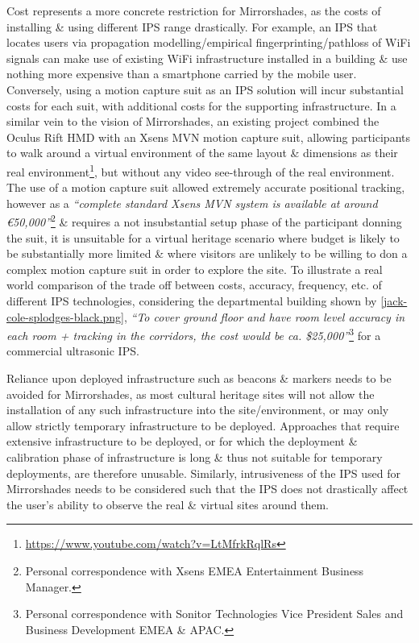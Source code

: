 Cost represents a more concrete restriction for Mirrorshades, as the costs of installing \& using different IPS range drastically. For example, an IPS that locates users via propagation modelling/empirical fingerprinting/pathloss of WiFi signals can make use of existing WiFi infrastructure installed in a building \& use nothing more expensive than a smartphone carried by the mobile user. Conversely, using a motion capture suit as an IPS solution will incur substantial costs for each suit, with additional costs for the supporting infrastructure. In a similar vein to the vision of Mirrorshades, an existing project combined the Oculus Rift HMD with an Xsens MVN motion capture suit, allowing participants to walk around a virtual environment of the same layout \& dimensions as their real environment\footnote{\url{https://www.youtube.com/watch?v=LtMfrkRqlRs}}, but without any video see-through of the real environment. The use of a motion capture suit allowed extremely accurate positional tracking, however as a \textit{``complete standard Xsens MVN system is available at around \euro{}50,000''}\footnote{Personal correspondence with Xsens EMEA Entertainment Business Manager.} \& requires a not insubstantial setup phase of the participant donning the suit, it is unsuitable for a virtual heritage scenario where budget is likely to be substantially more limited \&  where visitors are unlikely to be willing to don a complex motion capture suit in order to explore the site. To illustrate a real world comparison of the trade off between costs, accuracy, frequency, etc. of different IPS technologies, considering the departmental building shown by \ref{jack-cole-splodges-black.png}, \textit{``To cover ground floor and have room level accuracy in each room + tracking in the corridors, the cost would be ca. \$25,000''}\footnote{Personal correspondence with Sonitor Technologies Vice President Sales and Business Development EMEA \& APAC.} for a commercial ultrasonic IPS.

Reliance upon deployed infrastructure such as beacons \& markers needs to be avoided for Mirrorshades, as most cultural heritage sites will not allow the installation of any such infrastructure into the site/environment, or may only allow strictly temporary infrastructure to be deployed. Approaches that require extensive infrastructure to be deployed, or for which the deployment \& calibration phase of infrastructure is long \& thus not suitable for temporary deployments, are therefore unusable. Similarly, intrusiveness of the IPS used for Mirrorshades needs to be considered such that the IPS does not drastically affect the user's ability to observe the real \& virtual sites around them.

